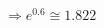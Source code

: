 \documentclass[11pt,a4paper,titlepage,oneside,openany]{article}
\numberwithin{equation}{section}
\numberwithin{algorithm}{section}
\numberwithin{figure}{section}
\numberwithin{table}{section}
\begin{document}
\begin{enumerate}
\begin{tabular}{|l|c|c:c:c:c:c:c:c:c:c:c:c|c|c:c:c:c:c:c:c:c:c:c:c|}
\end{tabular}
\\
\\
\\
$\Rightarrow e^{0.6} \cong 1.822$


\end{enumerate}
\end{document}
